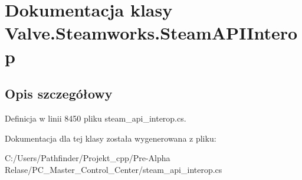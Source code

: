 \hypertarget{class_valve_1_1_steamworks_1_1_steam_a_p_i_interop}{}\section{Dokumentacja klasy Valve.\+Steamworks.\+Steam\+A\+P\+I\+Interop}
\label{class_valve_1_1_steamworks_1_1_steam_a_p_i_interop}


\subsection{Opis szczegółowy}


Definicja w linii 8450 pliku steam\+\_\+api\+\_\+interop.\+cs.



Dokumentacja dla tej klasy została wygenerowana z pliku\+:\begin{DoxyCompactItemize}
\item 
C\+:/\+Users/\+Pathfinder/\+Projekt\+\_\+cpp/\+Pre-\/\+Alpha Relase/\+P\+C\+\_\+\+Master\+\_\+\+Control\+\_\+\+Center/steam\+\_\+api\+\_\+interop.\+cs\end{DoxyCompactItemize}
